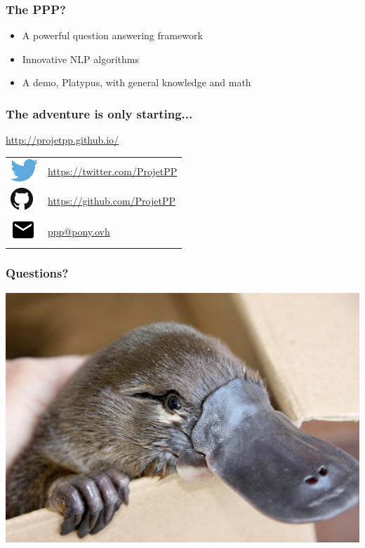 \begin{frame}
    \frametitle{The PPP?}

    \begin{itemize}
        \item A powerful question answering framework
        \item Innovative NLP algorithms
        \item A demo, \alert{Platypus}, with general knowledge and math
    \end{itemize}
\end{frame}


\newlength{\logosize}
\setlength{\logosize}{12pt}
\begin{frame}
    \frametitle{The adventure is only starting...}
    \alert{\url{http://projetpp.github.io/}}

    \begin{tabular}{ll}
        \includegraphics[width=\logosize]{Twitter_logo_blue.png} & \href{https://twitter.com/ProjetPP}{https://twitter.com/ProjetPP}\\
        \includegraphics[width=\logosize]{GitHub-Mark-32px.png} &  \href{https://github.com/ProjetPP}{https://github.com/ProjetPP}\\
        \includegraphics[width=\logosize]{ic_email_black_18dp.png} & \href{mailto:ppp@pony.ovh}{ppp@pony.ovh}\\
    \end{tabular}
\end{frame}


\begin{frame}
    \frametitle{Questions?}
    \includegraphics[width=\linewidth]{figures/platypusLg.jpg}
\end{frame}
